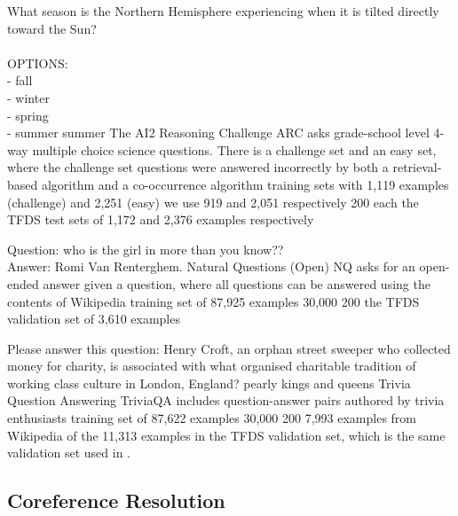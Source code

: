 \taskio
{What season is the Northern Hemisphere experiencing when it is tilted directly toward the Sun?\\\\OPTIONS:\\- fall\\- winter\\- spring\\- summer}
{summer}
{
\taskdescription
    {The AI2 Reasoning Challenge} %
    {ARC} %
    {\citep{clark2018think}} %
    {asks grade-school level 4-way multiple choice science questions. There is a challenge set and an easy set, where the challenge set questions were answered incorrectly by both a retrieval-based algorithm and a co-occurrence algorithm} %
    {training sets with 1,119 examples (challenge) and 2,251 (easy)} %
    {we use 919 and 2,051 respectively} %
    {200 each} %
    {the TFDS test sets of 1,172 and 2,376 examples respectively} %
}


\taskio
{Question: who is the girl in more than you know??\\Answer:}
{Romi Van Renterghem.}
{
    \taskdescription
    {Natural Questions (Open)} %
    {NQ} %
    {\citep{orqa,kwiatkowski2019natural}} %
    {asks for an open-ended answer given a question, where all questions can be answered using the contents of Wikipedia} %
    {training set of 87,925 examples} %
    {30,000} %
    {200} %
    {the TFDS validation set of 3,610 examples} %
}


\taskio
{Please answer this question: Henry Croft, an orphan street sweeper who collected money for charity, is associated with what organised charitable tradition of working class culture in London, England?}
{pearly kings and queens}
{
    \taskdescription
    {Trivia Question Answering} %
    {TriviaQA} %
    {\cite{JoshiTriviaQA2017}} %
    {includes question-answer pairs authored by trivia enthusiasts} %
    {training set of 87,622 examples} %
    {30,000} %
    {200} %
    {7,993 examples from Wikipedia of the 11,313 examples in the TFDS validation set, which is the same validation set used in \citep{brown2020language}.} %
}










\clearpage 
\subsection{Coreference Resolution}\label{appen:b-coreference}



